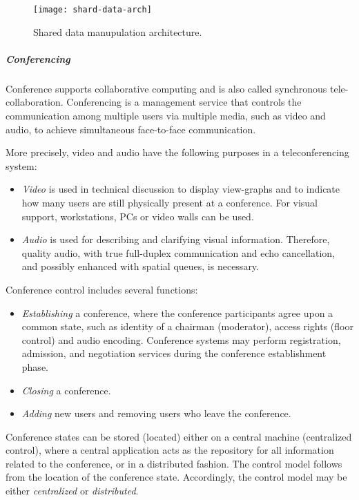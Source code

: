 \begin{figure}[th!]
	\centering
	\texttt{[image: shard-data-arch]}
	\caption{Shared data manupulation architecture.}
	\label{fig:shard-data-arch}
\end{figure}


\subparagraph{Conferencing}
Conference supports collaborative computing and is also called synchronous tele-collaboration. Conferencing is a management service that controls the communication among multiple users via multiple media, such as video and
audio, to achieve simultaneous face-to-face communication.


More precisely, video and audio have the following purposes in a teleconferencing system:

\begin{itemize}
	\item \textit{Video} is used in technical discussion to display view-graphs and to indicate	how many users are still physically present at a conference. For visual support, workstations, PCs or video walls can be used.
	\item \textit{Audio} is used for describing and	clarifying visual information. Therefore, quality audio, with true full-duplex communication and echo cancellation, and possibly enhanced with spatial queues, is necessary.
\end{itemize}

Conference control includes several functions:
\begin{itemize}
	\item \textit{Establishing} a conference, where the conference participants agree upon a	common state, such as identity of a chairman (moderator), access rights (floor control) and audio encoding. Conference systems may perform
	registration, admission, and negotiation services during the conference	establishment phase.
	\item \textit{Closing} a conference.
	\item \textit{Adding} new users and removing users who leave the conference.
\end{itemize}

Conference states can be stored (located) either on a central machine (centralized control), where a central application acts as the repository for all information related to the conference, or in a distributed fashion. The control model follows from the location of the conference state. Accordingly, the control model may be either \textit{centralized} or \textit{distributed}.


